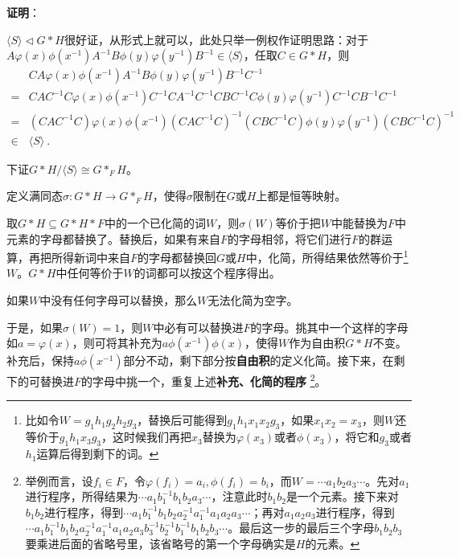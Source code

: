\textbf{证明}：

$\langle S \rangle \lhd G*H$很好证，从形式上就可以，此处只举一例权作证明思路：对于$A\varphi(x)\phi(x^{-1})A^{-1}B\phi(y)\varphi(y^{-1})B^{-1}\in \langle S \rangle$，任取$C\in G*H$，则
\begin{equation}
\begin{aligned}
    &CA\varphi(x)\phi(x^{-1})A^{-1}B\phi(y)\varphi(y^{-1})B^{-1}C^{-1} \\
    ={}& 
    CAC^{-1}C\varphi(x)\phi(x^{-1})C^{-1}CA^{-1}C^{-1}CBC^{-1}C\phi(y)\varphi(y^{-1})C^{-1}CB^{-1}C^{-1}\\
    ={}& 
    (CAC^{-1}C)\varphi(x)\phi(x^{-1})(CAC^{-1}C)^{-1}(CBC^{-1}C)\phi(y)\varphi(y^{-1})(CBC^{-1}C)^{-1}\\
    \in{}& \langle S \rangle~.
\end{aligned}
\end{equation}

下证$G*H/\langle S \rangle \cong G*_F H$。

定义满同态$\sigma:G*H\to G*_FH$，使得$\sigma$限制在$G$或$H$上都是恒等映射。

取$G*H\subseteq G*H*F$中的一个已化简的词$W$，则$\sigma(W)$等价于把$W$中能替换为$F$中元素的字母都替换了。替换后，如果有来自$F$的字母相邻，将它们进行$F$的群运算，再把所得新词中来自$F$的字母都替换回$G$或$H$中，化简，所得结果依然等价于\footnote{比如令$W=g_1h_1g_2h_2g_3$，替换后可能得到$g_1h_1x_1x_2g_3$，如果$x_1x_2=x_3$，则$W$还等价于$g_1h_1x_3g_3$，这时候我们再把$x_3$替换为$\varphi(x_3)$或者$\phi(x_3)$，将它和$g_3$或者$h_1$运算后得到剩下的词。}
$W$。$G*H$中任何等价于$W$的词都可以按这个程序得出。

如果$W$中没有任何字母可以替换，那么$W$无法化简为空字。

于是，如果$\sigma(W)=1$，则$W$中必有可以替换进$F$的字母。挑其中一个这样的字母如$a=\varphi(x)$，则可将其补充为$a\phi(x^{-1})\phi(x)$，使得$W$作为自由积$G*H$不变。补充后，保持$a\phi(x^{-1})$部分不动，剩下部分按\textbf{自由积}的定义化简。接下来，在剩下的可替换进$F$的字母中挑一个，重复上述\textbf{补充、化简的程序}
\footnote{举例而言，设$f_i\in F$，令$\varphi(f_i)=a_i, \phi(f_i)=b_i$，而$W=\cdots a_1b_2a_3 \cdots$。先对$a_1$进行程序，所得结果为$\cdots a_1b_1^{-1}b_1b_2a_3 \cdots $，注意此时$b_1b_2$是一个元素。接下来对$b_1b_2$进行程序，得到$\cdots a_1b_1^{-1}b_1b_2a_2^{-1}a_1^{-1}a_1a_2a_3 \cdots $；再对$a_1a_2a_3$进行程序，得到$\cdots a_1b_1^{-1}b_1b_2a_2^{-1}a_1^{-1}a_1a_2a_3b_3^{-1}b_2^{-1}b_1^{-1}b_1b_2b_3 \cdots $。最后这一步的最后三个字母$b_1b_2b_3$要乘进后面的省略号里，该省略号的第一个字母确实是$H$的元素。
}。

